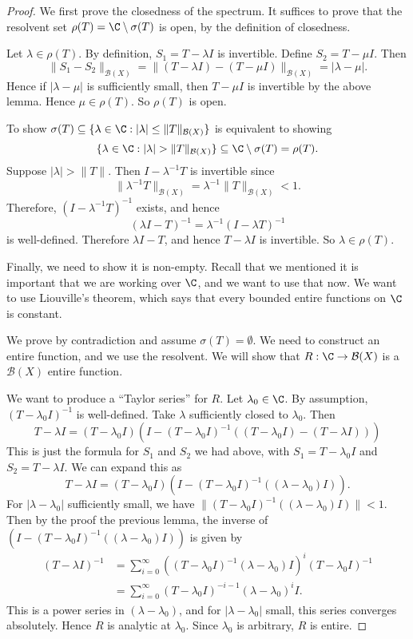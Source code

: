 \documentclass[a4paper]{article}
\begin{document}
\begin{proof}
  We first prove the closedness of the spectrum. It suffices to prove that the resolvent set $\rho(T) = \C \setminus \sigma(T)$ is open, by the definition of closedness.

  Let $\lambda \in \rho(T)$. By definition, $S_1 = T - \lambda I$ is invertible. Define $S_2 = T - \mu I$. Then
  \[
    \|S_1 - S_2\|_{\mathcal{B}(X)} = \|(T - \lambda I) - (T - \mu I)\|_{\mathcal{B}(X)} = |\lambda - \mu|.
  \]
  Hence if $|\lambda - \mu|$ is sufficiently small, then $T - \mu I$ is invertible by the above lemma. Hence $\mu \in \rho(T)$. So $\rho(T)$ is open.

  To show $\sigma(T) \subseteq \{\lambda \in \C: |\lambda| \leq \|T\|_{\mathcal{B}(X)}\}$ is equivalent to showing
  \[
    \{\lambda \in \C: |\lambda| > \|T\|_{\mathcal{B}(X)}\} \subseteq \C \setminus \sigma(T) = \rho(T).
  \]
  Suppose $|\lambda| > \|T\|$. Then $I - \lambda^{-1} T$ is invertible since
  \[
    \|\lambda^{-1} T\|_{\mathcal{B}(X)} = \lambda^{-1} \|T\|_{\mathcal{B}(X)} < 1.
  \]
  Therefore, $(I - \lambda^{-1} T)^{-1}$ exists, and hence
  \[
    (\lambda I - T)^{-1} = \lambda^{-1} (I - \lambda T)^{-1}
  \]
  is well-defined. Therefore $\lambda I - T$, and hence $T - \lambda I$ is invertible. So $\lambda \in \rho(T)$.

  Finally, we need to show it is non-empty. Recall that we mentioned it is important that we are working over $\C$, and we want to use that now. We want to use Liouville's theorem, which says that every bounded entire functions on $\C$ is constant.

  We prove by contradiction and assume $\sigma(T) = \emptyset$. We need to construct an entire function, and we use the resolvent. We will show that $R: \C \to \mathcal{B}(X)$ is a $\mathcal{B}(X)$ entire function.

  We want to produce a ``Taylor series'' for $R$. Let $\lambda_0 \in \C$. By assumption, $(T - \lambda_0 I)^{-1}$ is well-defined. Take $\lambda$ sufficiently closed to $\lambda_0$. Then
  \[
    T - \lambda I = (T - \lambda_0 I)(I - (T - \lambda_0 I)^{-1} ((T - \lambda_0 I) - (T - \lambda I)))
  \]
  This is just the formula for $S_1$ and $S_2$ we had above, with $S_1 = T - \lambda_0 I$ and $S_2 = T - \lambda I$. We can expand this as
  \[
    T - \lambda I = (T - \lambda_0 I)(I - (T - \lambda_0 I)^{-1}((\lambda - \lambda_0)I)).
  \]
  For $|\lambda - \lambda_0|$ sufficiently small, we have $\|(T - \lambda_0 I)^{-1}((\lambda - \lambda_0)I)\| < 1$. Then by the proof the previous lemma, the inverse of $(I - (T - \lambda_0 I)^{-1}((\lambda - \lambda_0)I))$ is given by
  \begin{align*}
    (T - \lambda I)^{-1} &= \sum_{i = 0}^\infty ((T - \lambda_0 I)^{-1} (\lambda - \lambda_0) I)^i (T - \lambda_0 I)^{-1}\\
    &= \sum_{i = 0}^\infty (T - \lambda_0 I)^{-i - 1}(\lambda - \lambda_0)^i I.
  \end{align*}
  This is a power series in $(\lambda - \lambda_0)$, and for $|\lambda - \lambda_0|$ small, this series converges absolutely. Hence $R$ is analytic at $\lambda_0$. Since $\lambda_0$ is arbitrary, $R$ is entire.


\end{proof}
\end{document}
